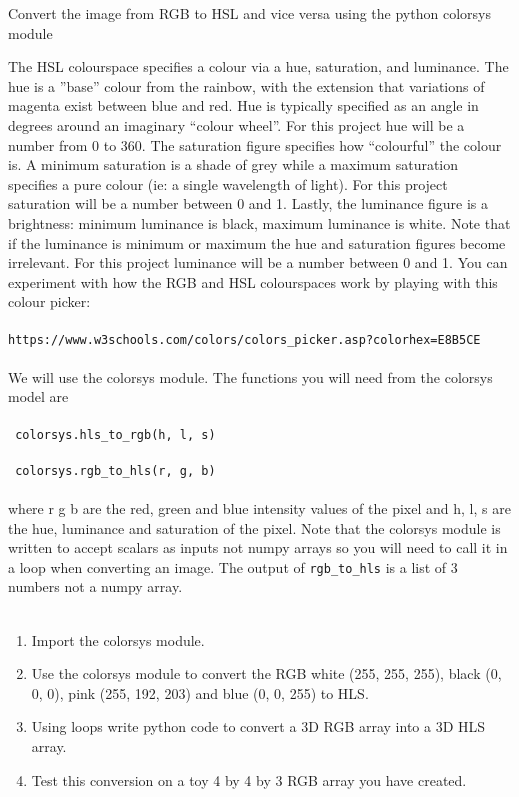 \documentclass{lab}
\begin{document}
\begin{task}{Convert the image from RGB to HSL and vice versa using the python colorsys module}{}

The HSL colourspace speciﬁes a colour via a hue, saturation, and luminance. The hue is a ”base” colour from the rainbow, with the extension that variations of magenta exist between blue and red. Hue is typically speciﬁed as an angle in degrees around an imaginary “colour wheel”. For this project hue will be a number from 0 to 360.
The saturation ﬁgure speciﬁes how “colourful” the colour is. A minimum saturation is a shade of grey while a maximum saturation speciﬁes a pure colour (ie: a single wavelength of light). For this project saturation will be a number between 0 and 1.
Lastly, the luminance ﬁgure is a brightness: minimum luminance is black, maximum luminance is white. Note that if the luminance is minimum or maximum the hue and saturation ﬁgures become irrelevant. For this project luminance will be a number between 0 and 1.
You can experiment with how the RGB and HSL colourspaces work by playing with this colour picker: \\~\\ \texttt{https://www.w3schools.com/colors/colors\_picker.asp?colorhex=E8B5CE} \\~\\
We will use the colorsys module. 
The functions you will need from the colorsys model are
\\~\\ \texttt{ colorsys.hls\_to\_rgb(h, l, s)} \\~\\
 \texttt{ colorsys.rgb\_to\_hls(r, g, b)} \\~\\
where r g b are the red, green and blue intensity values of the pixel and h, l, s are the hue, luminance and saturation of the pixel. Note that the colorsys module is written to accept scalars as inputs not numpy arrays so you will need to call it in a loop when converting an image. The output of  \texttt{rgb\_to\_hls}  is a list of 3 numbers not a numpy array. \\~


\begin{enumerate}
\item Import the colorsys module. 
\item Use the colorsys module to convert the RGB white (255, 255, 255), black (0, 0, 0), pink (255, 192, 203) and blue (0, 0, 255) to HLS.  
\item Using loops write python code to convert a 3D RGB array into a 3D HLS array. 
\item Test this conversion on a toy 4 by 4 by 3 RGB array you have created. 
\end{enumerate}

\end{task}
\end{document}
